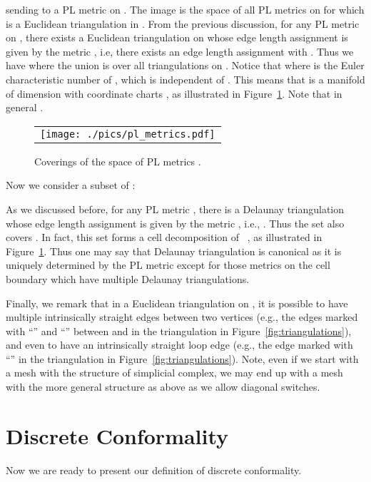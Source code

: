 \documentclass[11pt]{article}
\begin{document}
sending  to a PL metric  on . The image  is the space
of all PL metrics  on  for which  is a Euclidean triangulation in . 
From the previous discussion, for any PL metric  on 
, there exists a Euclidean triangulation  on  whose edge length assignment is
given by the metric , i.e, there exists an edge length assignment  with .  
Thus we have  where the union is over all triangulations on . Notice that
 where  is the Euler characteristic number of , which is independent of . 
This means that   is a manifold of dimension 
with coordinate charts , as illustrated in 
Figure~\ref{fig:pl_metrics}. Note that in general .

\begin{figure}[t]
\begin{center}
\begin{tabular}{c}
\texttt{[image: ./pics/pl\_metrics.pdf]}
\end{tabular}
\vspace{-0.1in}
\end{center}
\caption{Coverings of the space of PL metrics .
\label{fig:pl_metrics}}
\end{figure}

Now we consider a subset of :

As we discussed before, for any PL metric , there is a Delaunay triangulation  whose edge length assignment 
is given by the metric , i.e., . 
Thus the set  also covers . 
In fact, this set forms a cell decomposition of ~\cite{rivin, glsw1}, as illustrated in Figure~\ref{fig:pl_metrics}.
Thus one may say that Delaunay triangulation is canonical as it is uniquely determined by the PL metric except 
for those metrics on the cell boundary which have multiple Delaunay triangulations.


Finally, we remark that in a Euclidean triangulation  on , it is possible to have multiple intrinsically 
straight edges between two vertices (e.g., the edges marked with ``'' and ``'' between 
 and  in the triangulation  in Figure~\ref{fig:triangulations}), 
and even to have an intrinsically straight loop edge (e.g., the edge marked with ``'' in the 
triangulation  in Figure~\ref{fig:triangulations}). Note, even if we start with a mesh 
with the structure of simplicial complex, we may end up with a mesh
with the more general structure as above as we allow diagonal switches. 

\section{Discrete Conformality}
Now we are ready to present our definition of discrete conformality. 
\end{document}
